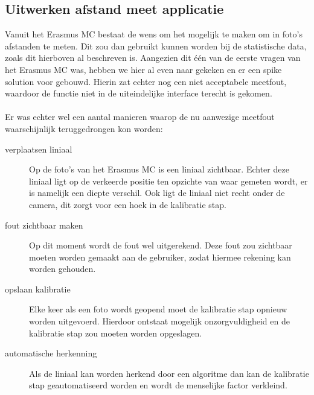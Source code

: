 \subsection{Uitwerken afstand meet applicatie} %
\label{customjaap}
Vanuit het Erasmus MC bestaat de wens om het mogelijk te maken om in foto's afstanden te meten.
Dit zou dan gebruikt kunnen worden bij de statistische data, zoals dit hierboven al beschreven is.
Aangezien dit \'{e}\'{e}n van de eerste vragen van het Erasmus MC was, hebben we hier al even naar gekeken en er een spike solution voor gebouwd.
Hierin zat echter nog een niet acceptabele meetfout, waardoor de functie niet in de uiteindelijke interface terecht is gekomen.
\\
\\
Er was echter wel een aantal manieren waarop de nu aanwezige meetfout waarschijnlijk teruggedrongen kon worden:
\begin{description}
	\item[verplaatsen liniaal] Op de foto's van het Erasmus MC is een liniaal zichtbaar. 
	Echter deze liniaal ligt op de verkeerde positie ten opzichte van waar gemeten wordt, er is namelijk een diepte verschil. 
	Ook ligt de liniaal niet recht onder de camera, dit zorgt voor een hoek in de kalibratie stap.
	\item[fout zichtbaar maken] Op dit moment wordt de fout wel uitgerekend. 
	Deze fout zou zichtbaar moeten worden gemaakt aan de gebruiker, zodat hiermee rekening kan worden gehouden.
	\item[opslaan kalibratie] Elke keer als een foto wordt geopend moet de kalibratie stap opnieuw worden uitgevoerd. 
	Hierdoor ontstaat mogelijk onzorgvuldigheid en de kalibratie stap zou moeten worden opgeslagen.
	\item[automatische herkenning] Als de liniaal kan worden herkend door een algoritme dan kan de kalibratie stap geautomatiseerd worden en wordt de menselijke factor verkleind.
\end{description}

